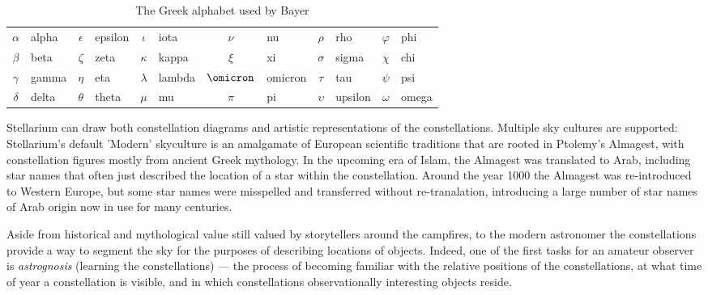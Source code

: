 \begin{table}[p]
  \centering
  \begin{tabular}{>{$}c<{$}l>{$}c<{$}l>{$}c<{$}l>{$}c<{$}l>{$}c<{$}l>{$}c<{$}l}
    \toprule
    \alpha    & alpha   & \epsilon  & epsilon & \iota     & iota    & \nu       & nu       & \rho     & rho       & \varphi  & phi    \\ 
    \beta     & beta    & \zeta     & zeta    & \kappa    & kappa   & \xi       & xi       & \sigma   & sigma     & \chi     & chi    \\ 
    \gamma    & gamma   & \eta      & eta     & \lambda   & lambda  & \omicron  & omicron  & \tau     & tau       & \psi     & psi    \\ 
    \delta    & delta   & \theta    & theta   & \mu       & mu      & \pi       & pi       & \upsilon & upsilon   & \omega   & omega  \\ 
     \bottomrule
 \end{tabular}
  \caption{The Greek alphabet used by Bayer}
  \label{tab:Phenomena:StarNames:BayerLetters}
\end{table}


Stellarium can draw both constellation diagrams and artistic
representations of the constellations. Multiple sky cultures are
supported: Stellarium's default 'Modern' skyculture is an amalgamate of European scientific traditions 
that are rooted in Ptolemy's Almagest, with constellation figures mostly from ancient Greek mythology. 
In the upcoming era of Islam, the Almagest was translated to Arab, including
star names that often just described the location of a star within the constellation. 
Around the year 1000 the Almagest was re-introduced to Western Europe, but some star names were misspelled 
and transferred without re-tranalation, introducing a large number of star names of Arab origin now in use for many centuries.

Aside from historical and mythological value still valued by storytellers around the campfires, 
to the modern astronomer
the constellations provide a way to segment the sky for the purposes
of describing locations of objects. Indeed, one of the first tasks for
an amateur observer is \emph{astrognosis} (learning the constellations) --- the
process of becoming familiar with the relative positions of the
constellations, at what time of year a constellation is visible, and
in which constellations observationally interesting objects reside.

